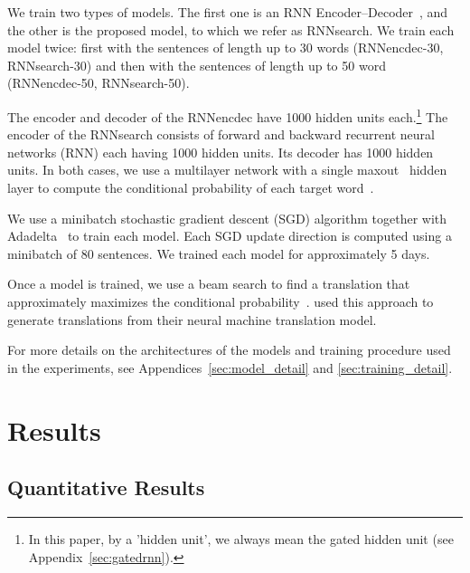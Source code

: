 \documentclass{article} %
\begin{document}
We train two types of models. The first one is an RNN
Encoder--Decoder~\citep[RNNencdec,][]{Cho2014}, and the other is the proposed
model, to which we refer as RNNsearch. We train each model twice: first with the
sentences of length up to 30 words (RNNencdec-30, RNNsearch-30) and then with the
sentences of length up to 50 word (RNNencdec-50, RNNsearch-50).

The encoder and decoder of the RNNencdec have 1000 hidden units each.\footnote{
    In this paper, by a 'hidden unit', we always mean the gated hidden unit (see
    Appendix~\ref{sec:gatedrnn}).
} The encoder of the RNNsearch consists of forward and backward recurrent neural
networks (RNN) each having 1000 hidden units. Its decoder has 1000 hidden units.
In both cases, we use a multilayer network with a single
maxout~\citep{Goodfellow2013} hidden layer to compute the conditional
probability of each target word~\citep{Pascanu2014rec}.

We use a minibatch stochastic gradient descent (SGD) algorithm together with
Adadelta~\citep{Zeiler2012} to train each model. Each SGD update direction is
computed using a minibatch of 80 sentences. We trained each model for
approximately 5 days.

Once a model is trained, we use a beam search to find a translation that
approximately maximizes the conditional probability~\citep[see,
e.g.,][]{Graves2012,Boulanger2013}. \citet{Sutskever2014} used this approach to
generate translations from their neural machine translation model.

For more details on the architectures of the models and training procedure used
in the experiments, see Appendices~\ref{sec:model_detail} and
\ref{sec:training_detail}.

\section{Results}
\label{sec:exp_results}

\subsection{Quantitative Results}
\end{document}

